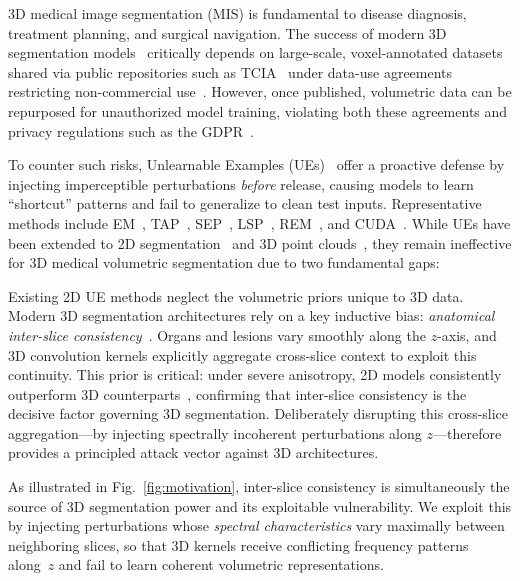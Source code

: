 \documentclass[runningheads]{llncs}
\begin{document}
3D medical image segmentation (MIS) is fundamental to disease diagnosis, treatment planning, and surgical navigation. The success of modern 3D segmentation models~\cite{cciccek20163d,milletari2016v,isensee2021nnu,hatamizadeh2022unetr,tang2022swinunetr} critically depends on large-scale, voxel-annotated datasets shared via public repositories such as TCIA~\cite{tcia} under data-use agreements restricting non-commercial use~\cite{menze2014multimodal,ma2021abdomenct}.
However, once published, volumetric data can be repurposed for unauthorized model training, violating both these agreements and privacy regulations such as the GDPR~\cite{gdpr2016,kaissis2021end}.

To counter such risks, Unlearnable Examples (UEs)~\cite{huang2021unlearnable} offer a proactive defense by injecting imperceptible perturbations \textit{before} release, causing models to learn ``shortcut'' patterns and fail to generalize to clean test inputs. Representative methods include EM~\cite{huang2021unlearnable}, TAP~\cite{fowl2021adversarial}, SEP~\cite{liu2023stable}, LSP~\cite{yu2022availability}, REM~\cite{fu2022robust}, and CUDA~\cite{sadasivan2023cuda}. While UEs have been extended to 2D segmentation~\cite{sun2024unseg} and 3D point clouds~\cite{wang2024unlearnable3d}, they remain ineffective for 3D medical volumetric segmentation due to two fundamental gaps:

Existing 2D UE methods neglect the volumetric priors unique to 3D data. Modern 3D segmentation architectures rely on a key inductive bias: \textit{anatomical inter-slice consistency}~\cite{isensee2021nnu,dong2022mnet}. Organs and lesions vary smoothly along the $z$-axis, and 3D convolution kernels explicitly aggregate cross-slice context to exploit this continuity. This prior is critical: under severe anisotropy, 2D models consistently outperform 3D counterparts~\cite{isensee2021nnu,dong2022mnet}, confirming that inter-slice consistency is the decisive factor governing 3D segmentation. Deliberately disrupting this cross-slice aggregation---by injecting spectrally incoherent perturbations along $z$---therefore provides a principled attack vector against 3D architectures.


As illustrated in Fig.~\ref{fig:motivation}, inter-slice consistency is simultaneously the source of 3D segmentation power and its exploitable vulnerability. We exploit this by injecting perturbations whose \emph{spectral characteristics} vary maximally between neighboring slices, so that 3D kernels receive conflicting frequency patterns along~$z$ and fail to learn coherent volumetric representations.
\end{document}
